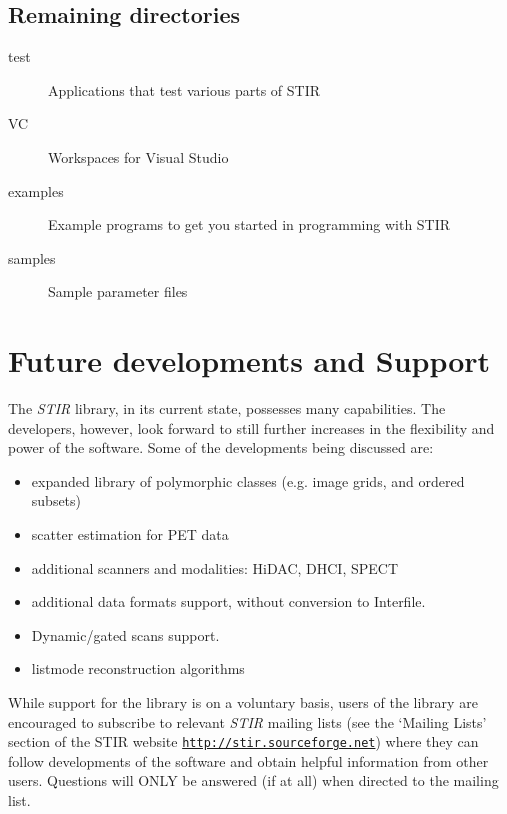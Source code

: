 \documentclass{article}
\def\R2Lurl#1#2{\mbox{\href{#1}{\tt #2}}}
\begin{document}
\subsection{Remaining directories}
\begin{description}
\item[test]
  Applications that test various parts of STIR
\item[VC]
  Workspaces for Visual Studio
\item[examples]
  Example programs to get you started in programming with STIR
\item[samples]
  Sample parameter files
\end{description}


\section{
Future developments and Support}

The \textit{STIR} library, in its current state, possesses many capabilities. 
The developers, however, look forward to still further increases 
in the flexibility and power of the software. Some of the developments 
being discussed are:

\begin{itemize}
\item
expanded library of polymorphic classes (e.g. image grids, and 
ordered subsets)
\item 
scatter estimation for PET data
\item
additional scanners and modalities: HiDAC, DHCI, SPECT
\item
additional data formats support, without conversion to Interfile.
\item
Dynamic/gated scans support.
\item
listmode reconstruction algorithms
\end{itemize}


While support for the library is on a voluntary basis, users 
of the library are encouraged to subscribe to relevant \textit{STIR} 
mailing lists (see the `Mailing Lists' section of the STIR website 
\R2Lurl{http://stir.sourceforge.net/ }{http://stir.sourceforge.net}) 
where they can follow developments of the software and obtain 
helpful information from other users. Questions will ONLY be 
answered (if at all) when directed to the mailing list.
\end{document}
